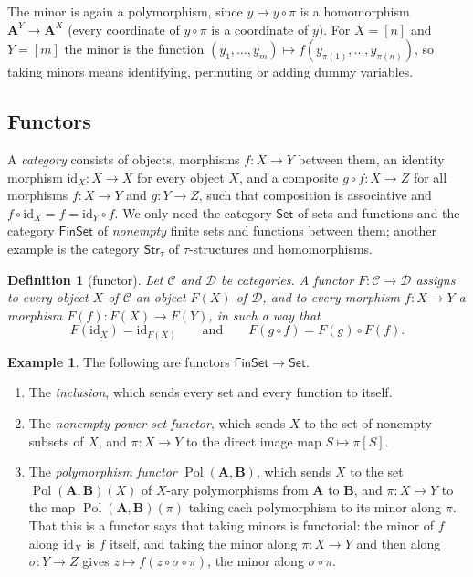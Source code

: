 \documentclass[11pt]{article}
\theoremstyle{plain}
\newtheorem{definition}[theorem]{Definition}
\theoremstyle{definition}
\newtheorem{example}[theorem]{Example}
\newcommand{\cat}[1]{\mathsf{#1}}
\newcommand{\Set}{\cat{Set}}
\newcommand{\FinSet}{\cat{FinSet}}
\newcommand{\Str}{\cat{Str}}
\newcommand{\Pol}{\operatorname{Pol}}
\newcommand{\id}{\mathrm{id}}
\newcommand{\bA}{\mathbf{A}}
\newcommand{\bB}{\mathbf{B}}
\begin{document}
The minor is again a polymorphism, since $y\mapsto y\circ\pi$ is a homomorphism $\bA^Y\to\bA^X$ (every coordinate of $y\circ\pi$ is a coordinate of $y$). For $X=[n]$ and $Y=[m]$ the minor is the function $(y_1,\dots,y_m)\mapsto f(y_{\pi(1)},\dots,y_{\pi(n)})$, so taking minors means identifying, permuting or adding dummy variables.

\subsection{Functors}\label{sec:fun}

A \emph{category} consists of objects, morphisms $f\colon X\to Y$ between them, an identity morphism $\id_X\colon X\to X$ for every object $X$, and a composite $g\circ f\colon X\to Z$ for all morphisms $f\colon X\to Y$ and $g\colon Y\to Z$, such that composition is associative and $f\circ\id_X=f=\id_Y\circ f$. We only need the category $\Set$ of sets and functions and the category $\FinSet$ of \emph{nonempty} finite sets and functions between them; another example is the category $\Str_\tau$ of $\tau$-structures and homomorphisms.

\begin{definition}[functor]
Let $\mathcal C$ and $\mathcal D$ be categories. A \emph{functor} $F\colon\mathcal C\to\mathcal D$ assigns to every object $X$ of $\mathcal C$ an object $F(X)$ of $\mathcal D$, and to every morphism $f\colon X\to Y$ a morphism $F(f)\colon F(X)\to F(Y)$, in such a way that
\[
F(\id_X)=\id_{F(X)}\qquad\text{and}\qquad F(g\circ f)=F(g)\circ F(f).
\]
\end{definition}

\begin{example}\label{ex:functors}
The following are functors $\FinSet\to\Set$.
\begin{enumerate}[label=(\alph*)]
  \item The \emph{inclusion}, which sends every set and every function to itself.
  \item The \emph{nonempty power set functor}, which sends $X$ to the set of nonempty subsets of $X$, and $\pi\colon X\to Y$ to the direct image map $S\mapsto\pi[S]$.
  \item The \emph{polymorphism functor} $\Pol(\bA,\bB)$, which sends $X$ to the set $\Pol(\bA,\bB)(X)$ of $X$-ary polymorphisms from $\bA$ to $\bB$, and $\pi\colon X\to Y$ to the map $\Pol(\bA,\bB)(\pi)$ taking each polymorphism to its minor along $\pi$. That this is a functor says that taking minors is functorial: the minor of $f$ along $\id_X$ is $f$ itself, and taking the minor along $\pi\colon X\to Y$ and then along $\sigma\colon Y\to Z$ gives $z\mapsto f(z\circ\sigma\circ\pi)$, the minor along $\sigma\circ\pi$.
\end{enumerate}
\end{example}
\end{document}
